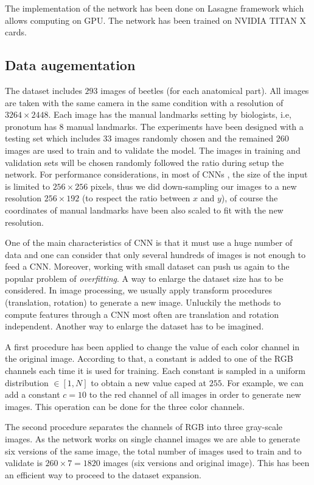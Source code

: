 \documentclass[10pt]{article}
\begin{document}
The implementation of the network has been done
on Lasagne framework \cite{lasagne} which allows computing on GPU. The
network has been trained on NVIDIA TITAN X cards.


\subsection{Data augementation}
\label{sec_data}
The dataset includes $293$ images of beetles (for each anatomical part). All
images are taken with the same camera in the same condition with a
resolution of $3264 \times 2448$. Each image has the manual
landmarks setting by biologists, i.e, pronotum has $8$ manual landmarks. The
experiments have been designed with a testing set which includes $33$ images randomly chosen and the remained $260$ images are used to train and to validate the model.
The images in training and validation sets will be chosen randomly followed
the ratio during setup the network. For performance considerations, in most of CNNs
\cite{lecun2010convolutional, sun2013deep,  krizhevsky2012imagenet,
  cintas2016automatic}, the size of the input is limited to $256
\times 256$ pixels, thus we did down-sampling our images to a new
resolution $256 \times 192$ (to respect the ratio between $x$ and
$y$), of course the coordinates of manual landmarks have been also
scaled to fit with the new resolution.


One of the main characteristics of CNN is that it must use a huge number of data 
and one can consider that only several hundreds of images is
not enough to feed a CNN. Moreover, working with small dataset can push
us again to the popular problem of \textit{overfitting}. A way to enlarge the dataset size has to be considered. In image processing, we usually apply
transform procedures (translation, rotation) to generate a new image. 
Unluckily the methods to compute features through a CNN
most often are translation and rotation independent. Another way to
enlarge the dataset has to be imagined.


A first procedure has been applied to change the value of each color 
channel in the original image. According to that, a constant is
added to one of the RGB channels each time it is used for training.
Each constant is sampled in a uniform distribution $\in [1,N]$ to obtain
a new value caped at $255$. For example, we can add a constant $c = 10$ to the 
red channel of all images in order to generate new images. 
This operation can be done for the three color channels.

The second procedure separates the channels of RGB into
three gray-scale images. As the network works on single channel images
we are able to  generate six versions of the same image, the total number of
images used to train and to validate is $260 \times 7 = 1820$ images
(six versions and original image). This has been an efficient way to
proceed to the dataset expansion. 
\end{document}
